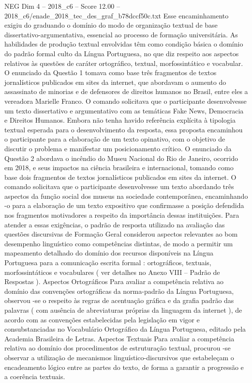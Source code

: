 \begin{textsample}{NEG Dim 4 – 2018\_c6 – Score 12.00 – 2018\_c6/enade\_2018\_tec\_des\_graf\_b78dccf50c.txt}
Esse encaminhamento exigiu do graduando o domínio do modo de organização textual de base dissertativo-argumentativa, essencial ao processo de formação universitária.
As habilidades de produção textual envolvidas têm como condição básica o domínio do padrão formal culto da Língua Portuguesa, no que diz respeito aos aspectos relativos às questões de caráter ortográfico, textual, morfossintático e vocabular.
O enunciado da Questão 1 tomava como base três fragmentos de textos jornalísticos publicados em sites da internet, que abordavam o aumento do assassinato de minorias e de defensores de direitos humanos no Brasil, entre eles a vereadora Marielle Franco.
O comando solicitava que o participante desenvolvesse um texto dissertativo e argumentativo com as temáticas Fake News, Democracia e Direitos Humanos.
Embora não tenha havido referência explícita à tipologia textual esperada para o desenvolvimento da resposta, essa proposta encaminhou o participante para a elaboração de um texto opinativo, com o objetivo de discutir o problema e manifestar um posicionamento crítico.
O enunciado da Questão 2 abordava o incêndio do Museu Nacional do Rio de Janeiro, ocorrido em 2018, e seus impactos na ciência brasileira e internacional, tomando como base dois fragmentos de textos jornalísticos publicados em sites da internet.
O comando solicitava que o participante desenvolvesse um texto abordando três aspectos da função social dos museus na sociedade contemporânea, encaminhando -o para a elaboração de um texto expositivo que confirmasse a posição defendida nos fragmentos motivadores a respeito da importância dessas instituições.
Para atender a essas exigências, o padrão de resposta utilizado na avaliação das questões discursivas de Formação Geral considerou aspectos relevantes ao bom desempenho linguístico como competências distintas, de modo a permitir um mapeamento detalhado do domínio dos recursos disponíveis na Língua Portuguesa para a comunicação escrita formal : ortográficos, textuais, morfossintáticos e vocabulares ( ver detalhes no Anexo VIII – Padrão de Respostas ).
Aspectos Ortográficos Para avaliar a competência relativa ao domínio das convenções ortográficas da norma-padrão da Língua Portuguesa, observou -se o respeito às regras de acentuação gráfica e da grafia padrão das palavras ( com ausência de abreviaturas próprias da linguagem da internet ), de acordo com as convenções estabelecidas pela legislação em vigor e consubstanciadas no Vocabulário Ortográfico da Língua Portuguesa, editado pela Academia Brasileira de Letras.
Aspectos Textuais Para avaliar a competência relativa ao domínio dos procedimentos de estruturação textual, procurou -se observar a utilização de mecanismos linguístico-discursivos que estabeleçam o encadeamento lógico entre as partes do texto, de forma a garantir a progressão e a coerência textuais.

\end{textsample}
